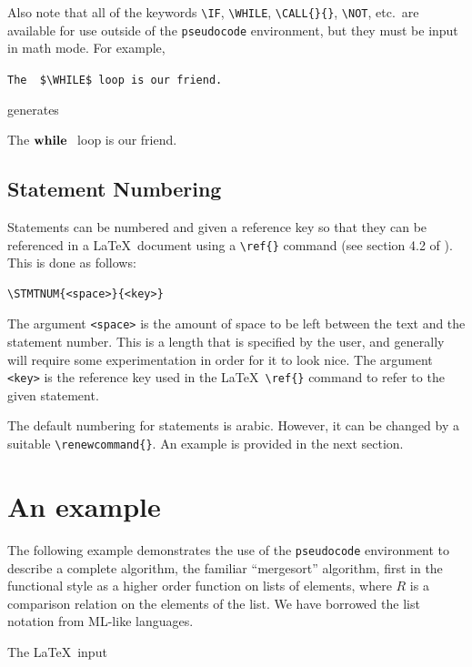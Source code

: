 \documentclass[a4]{article}
\newcommand{\keyword}[1]{\texttt{#1}}
\begin{document}
Also note 
that all of the keywords 
\verb+\IF+, \verb+\WHILE+, \verb+\CALL{}{}+, \verb+\NOT+, etc.\
are available for
use outside of the \keyword{pseudocode} environment, but they must
be input in math mode. For example,
\begin{center}
\verb+The  $\WHILE$ loop is our friend.+
\end{center}
generates
\begin{center}
The  $\mbox{\bfseries while }$ loop is our friend.
\end{center}


\subsection{Statement Numbering}

Statements can be numbered and given a reference key so that
they can be referenced in a \LaTeX\ document using a \verb+\ref{}+ command
(see section 4.2 of \cite{lamport}).
This is done as follows:

\begin{verbatim}
\STMTNUM{<space>}{<key>}
\end{verbatim}

\noindent{}The argument \verb+<space>+ is the amount of space to be left between
the text and the statement number.  This is a length that is specified by the
user, and generally will require some experimentation in order for it to look nice.
The argument \verb+<key>+ is the reference key
used in the LaTeX\  \verb+\ref{}+ command to refer to the given
statement.

The default numbering for statements is arabic. However, it can be changed
by a suitable \verb+\renewcommand{}+.
An example is provided in the next section.

\section{An example}

The following example demonstrates the use of the
\keyword{pseudocode} environment to describe a complete
algorithm, the familiar ``mergesort'' algorithm, first in the
functional style as a higher order function on lists of elements,
where $R$ is a comparison relation on the elements of the list.
We have borrowed the list notation from ML-like languages.

The \LaTeX\ input
\end{document}
